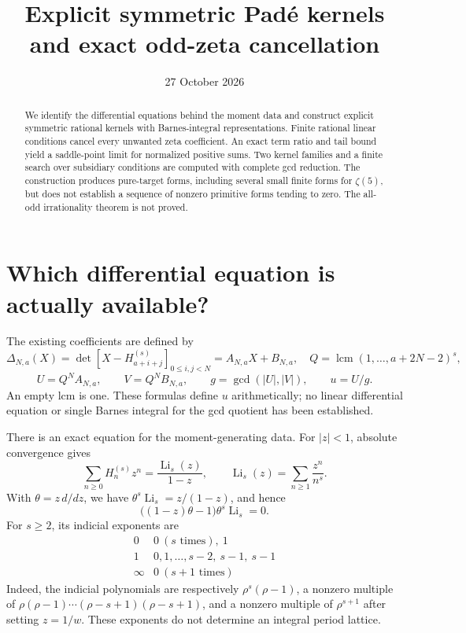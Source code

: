 \documentclass[11pt]{article}
\title{Explicit symmetric Pad\'e kernels\\and exact odd-zeta cancellation}
\author{}
\date{27 October 2026}
\newcommand{\HH}[2]{H_{#1}^{(#2)}}
\begin{document}
\maketitle
\begin{abstract}
We identify the differential equations behind the moment data and construct
explicit symmetric rational kernels with Barnes-integral representations.
Finite rational linear conditions cancel every unwanted zeta coefficient.
An exact term ratio and tail bound yield a saddle-point limit for
normalized positive sums.
Two kernel families and a finite search over subsidiary conditions are
computed with complete gcd reduction. The construction produces pure-target
forms, including several small finite forms for $\zeta(5)$, but does not
establish a sequence of nonzero primitive forms tending to zero.
The all-odd irrationality theorem is not proved.
\end{abstract}

\section{Which differential equation is actually available?}
The existing coefficients are defined by
\[
 \Delta_{N,a}(X)=\det[X-\HH{a+i+j}{s}]_{0\le i,j<N}=A_{N,a}X+B_{N,a},
 \quad Q=\operatorname{lcm}(1,\ldots,a+2N-2)^s,
\]
\[
 U=Q^NA_{N,a},\qquad V=Q^NB_{N,a},\qquad
 g=\gcd(|U|,|V|),\qquad u=U/g.
\]
An empty lcm is one. These formulas define $u$ arithmetically; no linear
differential equation or single Barnes integral for the gcd quotient
has been established.

There is an exact equation for the moment-generating data. For $|z|<1$,
absolute convergence gives
\[
 \sum_{n\ge0}\HH{n}{s}z^n=\frac{\operatorname{Li}_s(z)}{1-z},
 \qquad \operatorname{Li}_s(z)=\sum_{n\ge1}\frac{z^n}{n^s}.
\]
With $\theta=z\,d/dz$, we have
$\theta^s\operatorname{Li}_s=z/(1-z)$, and hence
\begin{equation}
 \bigl((1-z)\theta-1\bigr)\theta^s\operatorname{Li}_s=0.
 \label{eq:polylog}
\end{equation}
For $s\ge2$, its indicial exponents are
\[
 \begin{array}{c|c}
 0&0\ (s\text{ times}),\ 1\\
 1&0,1,\ldots,s-2,\ s-1,\ s-1\\
 \infty&0\ (s+1\text{ times})
 \end{array}
\]
Indeed, the indicial polynomials are respectively
$\rho^s(\rho-1)$, a nonzero multiple of
$\rho(\rho-1)\cdots(\rho-s+1)(\rho-s+1)$, and a nonzero
multiple of $\rho^{s+1}$ after setting $z=1/w$.
These exponents do not determine an integral period lattice.
\end{document}
